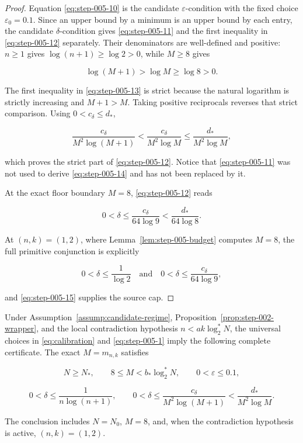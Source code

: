\begin{proof}
Equation \eqref{eq:step-005-10} is the candidate \(\varepsilon\)-condition with the fixed
choice \(\varepsilon_0=0.1\). Since an upper bound by a minimum is an upper
bound by each entry, the candidate \(\delta\)-condition gives \eqref{eq:step-005-11} and the
first inequality in \eqref{eq:step-005-12} separately. Their denominators are well-defined
and positive: \(n\ge1\) gives \(\log(n+1)\ge\log2>0\), while \(M\ge8\)
gives

\[
\log(M+1)>\log M\ge\log8>0.
\tag{S5.13}\label{eq:step-005-13}
\]

The first inequality in \eqref{eq:step-005-13} is strict because the natural logarithm is
strictly increasing and \(M+1>M\). Taking positive reciprocals reverses
that strict comparison. Using \(0<c_\delta\le d_*\),

\[
\frac{c_\delta}{M^2\log(M+1)}
<\frac{c_\delta}{M^2\log M}
\le\frac{d_*}{M^2\log M},
\tag{S5.14}\label{eq:step-005-14}
\]

which proves the strict part of \eqref{eq:step-005-12}. Notice that \eqref{eq:step-005-11} was not used to
derive \eqref{eq:step-005-14} and has not been replaced by it.

At the exact floor boundary \(M=8\), \eqref{eq:step-005-12} reads

\[
0<\delta\le\frac{c_\delta}{64\log9}
<\frac{d_*}{64\log8}.
\tag{S5.15}\label{eq:step-005-15}
\]

At \((n,k)=(1,2)\), where Lemma~\ref{lem:step-005-budget} computes
\(M=8\), the full primitive conjunction is explicitly

\[
0<\delta\le\frac1{\log2}
\quad\text{and}\quad
0<\delta\le\frac{c_\delta}{64\log9},
\]

and \eqref{eq:step-005-15} supplies the source cap. \end{proof}

\begin{proposition}\label{prop:step-005-certificate}
Under Assumption~\ref{assump:candidate-regime}, Proposition~\ref{prop:step-002-wrapper}, and the local contradiction
hypothesis \(n<ak\log_2^*N\), the universal choices in
\eqref{eq:calibration} and \eqref{eq:step-005-1} imply
the following complete certificate.  The exact \(M=m_{n,k}\) satisfies

\[
N\ge N_*,
\qquad 8\le M<b_*\log_2^*N,
\qquad 0<\varepsilon\le0.1,
\]

\[
0<\delta\le\frac1{n\log(n+1)},
\qquad
0<\delta\le\frac{c_\delta}{M^2\log(M+1)}
<\frac{d_*}{M^2\log M}.
\]

The conclusion includes \(N=N_0\), \(M=8\), and, when the contradiction
hypothesis is active, \((n,k)=(1,2)\).
\end{proposition}

